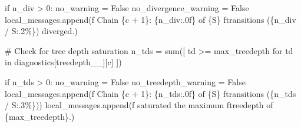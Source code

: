 \documentclass[
  letterpaper,
  DIV=11,
  numbers=noendperiod]{scrartcl}
\newenvironment{Shaded}{\begin{snugshade}}{\end{snugshade}}
\newcommand{\BuiltInTok}[1]{\textcolor[rgb]{0.00,0.23,0.31}{#1}}
\newcommand{\CommentTok}[1]{\textcolor[rgb]{0.37,0.37,0.37}{#1}}
\newcommand{\ControlFlowTok}[1]{\textcolor[rgb]{0.00,0.23,0.31}{#1}}
\newcommand{\DecValTok}[1]{\textcolor[rgb]{0.68,0.00,0.00}{#1}}
\newcommand{\KeywordTok}[1]{\textcolor[rgb]{0.00,0.23,0.31}{#1}}
\newcommand{\NormalTok}[1]{\textcolor[rgb]{0.00,0.23,0.31}{#1}}
\newcommand{\OperatorTok}[1]{\textcolor[rgb]{0.37,0.37,0.37}{#1}}
\newcommand{\SpecialCharTok}[1]{\textcolor[rgb]{0.37,0.37,0.37}{#1}}
\newcommand{\SpecialStringTok}[1]{\textcolor[rgb]{0.13,0.47,0.30}{#1}}
\newcommand{\StringTok}[1]{\textcolor[rgb]{0.13,0.47,0.30}{#1}}
\newcommand{\VariableTok}[1]{\textcolor[rgb]{0.07,0.07,0.07}{#1}}
\begin{document}
\begin{Shaded}
\begin{Highlighting}[]
    \ControlFlowTok{if}\NormalTok{ n\_div }\OperatorTok{\textgreater{}} \DecValTok{0}\NormalTok{:}
\NormalTok{      no\_warning }\OperatorTok{=} \VariableTok{False}
\NormalTok{      no\_divergence\_warning }\OperatorTok{=} \VariableTok{False}
\NormalTok{      local\_messages.append(}\SpecialStringTok{f\textquotesingle{}  Chain }\SpecialCharTok{\{}\NormalTok{c }\OperatorTok{+} \DecValTok{1}\SpecialCharTok{\}}\SpecialStringTok{: }\SpecialCharTok{\{}\NormalTok{n\_div}\SpecialCharTok{:.0f\}}\SpecialStringTok{ of }\SpecialCharTok{\{}\NormalTok{S}\SpecialCharTok{\}}\SpecialStringTok{ \textquotesingle{}}
                            \SpecialStringTok{f\textquotesingle{}transitions (}\SpecialCharTok{\{}\NormalTok{n\_div }\OperatorTok{/}\NormalTok{ S}\SpecialCharTok{:.2\%\}}\SpecialStringTok{) diverged.\textquotesingle{}}\NormalTok{)}
    
    \CommentTok{\# Check for tree depth saturation}
\NormalTok{    n\_tds }\OperatorTok{=} \BuiltInTok{sum}\NormalTok{([ td }\OperatorTok{\textgreater{}=}\NormalTok{ max\_treedepth }
                  \ControlFlowTok{for}\NormalTok{ td }\KeywordTok{in}\NormalTok{ diagnostics[}\StringTok{\textquotesingle{}treedepth\_\_\textquotesingle{}}\NormalTok{][c] ])}
    
    \ControlFlowTok{if}\NormalTok{ n\_tds }\OperatorTok{\textgreater{}} \DecValTok{0}\NormalTok{:}
\NormalTok{      no\_warning }\OperatorTok{=} \VariableTok{False}
\NormalTok{      no\_treedepth\_warning }\OperatorTok{=} \VariableTok{False}
\NormalTok{      local\_messages.append(}\SpecialStringTok{f\textquotesingle{}  Chain }\SpecialCharTok{\{}\NormalTok{c }\OperatorTok{+} \DecValTok{1}\SpecialCharTok{\}}\SpecialStringTok{: }\SpecialCharTok{\{}\NormalTok{n\_tds}\SpecialCharTok{:.0f\}}\SpecialStringTok{ of }\SpecialCharTok{\{}\NormalTok{S}\SpecialCharTok{\}}\SpecialStringTok{ \textquotesingle{}}
                            \SpecialStringTok{f\textquotesingle{}transitions (}\SpecialCharTok{\{}\NormalTok{n\_tds }\OperatorTok{/}\NormalTok{ S}\SpecialCharTok{:.3\%\}}\SpecialStringTok{)\textquotesingle{}}\NormalTok{)}
\NormalTok{      local\_messages.append(}\SpecialStringTok{f\textquotesingle{}           saturated the maximum \textquotesingle{}}
                            \SpecialStringTok{f\textquotesingle{}treedepth of }\SpecialCharTok{\{}\NormalTok{max\_treedepth}\SpecialCharTok{\}}\SpecialStringTok{.\textquotesingle{}}\NormalTok{)}


\end{Highlighting}
\end{Shaded}
\end{document}
